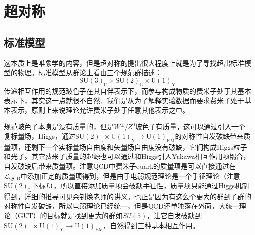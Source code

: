 \chapter{超对称}
\section{标准模型}
这本质上是唯象学的内容，但是超对称的提出很大程度上就是为了寻找超出标准模型的物理。标准模型从群论上看由三个规范群描述：
\begin{equation}
	\mathrm{SU}(3)_\mathrm{C}\times\mathrm{SU}(2)_\mathrm{L}\times\mathrm{U}(1)_\mathrm{Y}
\end{equation}
传递相互作用的规范玻色子在其自伴表示下，而参与构成物质的费米子处于其基本表示下，其实这一点就很不自然，我们是从为了解释实验数据而要求费米子处于基本表示，原则上来说理论允许费米子处于任意其他表示之中。

规范玻色子本身是没有质量的，但是$W^\pm/Z^0$玻色子有质量，这可以通过引入一个复标量场，Higgs，通过$\mathrm{SU}(2)_\mathrm{L}\times\mathrm{U}(1)_\mathrm{Y}\to \mathrm{U}(1)_{\mathrm{EM}}$的对称性自发破缺带来质量项，还剩下一个实标量场自由度和矢量场自由度没有破缺，它们构成Higgs粒子和光子。其它费米子质量的起源也可以通过和Higgs引入Yukawa相互作用项耦合，自发破缺后带来质量项。注意QCD中费米子quark的质量项是可以直接通过在$\mathcal{L}_{\mathrm{QCD}}$中添加正定的质量项得到，但是由于电弱规范理论是一个手征理论（注意$\mathrm{SU}(2)_\mathrm{L}$下标$L$），所以直接添加质量项会破缺手征性，质量项只能通过Higgs机制得到，详细的推导可见\href{https://yzhxxzxy.github.io/teaching/2209_SM_FR.pdf}{余钊焕老师的讲义}。也正是因为有这么个更大的群到子群的对称性自发破缺，所以电弱理论已经统一，但是QCD还单独落在外面，大统一理论（GUT）的目标就是找到更大的群如$SU(5)$，让它自发破缺到$\mathrm{SU}(2)_\mathrm{L}\times\mathrm{U}(1)_\mathrm{Y}\to \mathrm{U}(1)_{\mathrm{EM}}$，自然得到三种基本相互作用。

